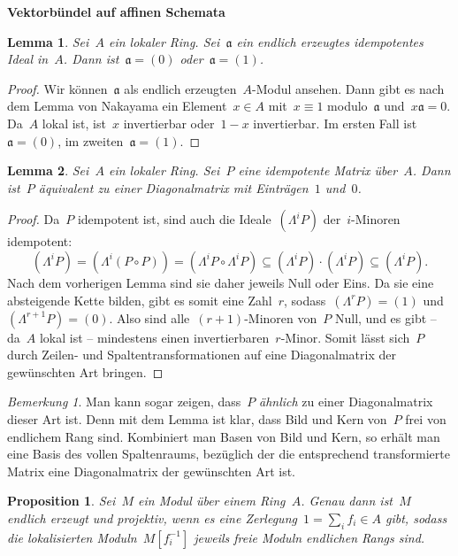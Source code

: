 \documentclass[12pt]{scrartcl}
\theoremstyle{definition}
\theoremstyle{plain}
\newtheorem*{prop}{Proposition}
\newtheorem*{lemma}{Lemma}
\theoremstyle{remark}
\newtheorem*{rem}{Bemerkung}
\newcommand{\aaa}{\mathfrak{a}}
\begin{document}
\enlargethispage{4em}

\begin{center}\huge\textbf{\textsf{Vektorbündel auf affinen Schemata}}\end{center}
\bigskip

\begin{lemma}Sei~$A$ ein lokaler Ring. Sei~$\aaa$ ein endlich erzeugtes
idempotentes Ideal in~$A$. Dann ist~$\aaa = (0)$ oder~$\aaa = (1)$.\end{lemma}

\begin{proof}Wir können~$\aaa$ als endlich erzeugten~$A$-Modul ansehen. Dann
gibt es nach dem Lemma von Nakayama ein Element~$x \in A$ mit~$x \equiv 1$
modulo~$\aaa$ und~$x \aaa = 0$. Da~$A$ lokal ist, ist~$x$ invertierbar
oder~$1-x$ invertierbar. Im ersten Fall ist~$\aaa = (0)$, im zweiten~$\aaa =
(1)$.\end{proof}

\begin{lemma}Sei~$A$ ein lokaler Ring. Sei~$P$ eine idempotente Matrix
über~$A$. Dann ist~$P$ äquivalent zu einer Diagonalmatrix mit Einträgen~$1$
und~$0$.\end{lemma}

\begin{proof}Da~$P$ idempotent ist, sind auch die Ideale~$(\Lambda^i P)$
der~$i$-Minoren idempotent: \[ (\Lambda^i P) = (\Lambda^i (P \circ P)) =
(\Lambda^i P \circ \Lambda^i P) \subseteq (\Lambda^i P) \cdot (\Lambda^i P)
\subseteq (\Lambda^i P). \] Nach dem vorherigen Lemma sind sie daher jeweils
Null oder Eins. Da sie eine absteigende Kette bilden, gibt es somit eine
Zahl~$r$, sodass~$(\Lambda^r P) = (1)$ und~$(\Lambda^{r+1} P) = (0)$. Also sind
alle~$(r+1)$-Minoren von~$P$ Null, und es gibt -- da~$A$ lokal ist --
mindestens einen invertierbaren~$r$-Minor. Somit lässt sich~$P$ durch Zeilen-
und Spaltentransformationen auf eine Diagonalmatrix der gewünschten Art
bringen. \end{proof}

\begin{rem}Man kann sogar zeigen, dass~$P$ \emph{ähnlich} zu einer
Diagonalmatrix dieser Art ist. Denn mit dem Lemma ist klar, dass Bild und Kern
von~$P$ frei von endlichem Rang sind. Kombiniert man Basen von Bild und Kern,
so erhält man eine Basis des vollen Spaltenraums, bezüglich der die
entsprechend transformierte Matrix eine Diagonalmatrix der gewünschten Art
ist.\end{rem}

\begin{prop}Sei~$M$ ein Modul über einem Ring~$A$. Genau dann ist~$M$
endlich erzeugt und projektiv, wenn es eine Zerlegung~$1 = \sum_i f_i \in A$
gibt, sodass die lokalisierten Moduln~$M[f_i^{-1}]$ jeweils freie Moduln
endlichen Rangs sind.\end{prop}
\end{document}
